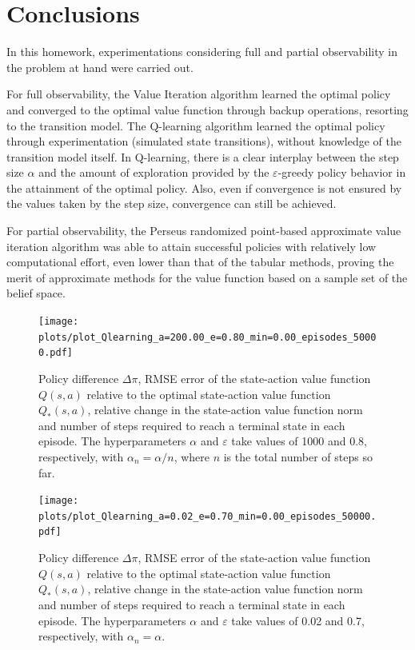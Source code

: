 \documentclass[a4paper]{article}
\begin{document}
\section{Conclusions}

In this homework, experimentations considering full and partial observability in the problem at hand were carried out.

For full observability, the Value Iteration algorithm learned the optimal policy and converged to the optimal value function through backup operations, resorting to the transition model. The Q-learning algorithm learned the optimal policy through experimentation (simulated state transitions), without knowledge of the transition model itself. In Q-learning, there is a clear interplay between the step size $\alpha$ and the amount of exploration provided by the $\varepsilon$-greedy policy behavior in the attainment of the optimal policy. Also, even if convergence is not ensured by the values taken by the step size, convergence can still be achieved. 

For partial observability, the Perseus randomized point-based approximate value iteration algorithm was able to attain successful policies with relatively low computational effort, even lower than that of the tabular methods, proving the merit of approximate methods for the value function based on a sample set of the belief space.


\begin{figure}[htbp]
\centering
\texttt{[image: plots/plot\_Qlearning\_a=200.00\_e=0.80\_min=0.00\_episodes\_50000.pdf]}
\caption{Policy difference $\Delta \pi$, RMSE error of the state-action value function $Q(s,a)$ relative to the optimal state-action value function $Q_{*}(s,a)$, relative change in the state-action value function norm and number of steps required to reach a terminal state in each episode. The hyperparameters $\alpha$ and $\varepsilon$ take values of 1000 and 0.8, respectively, with $\alpha_n = \alpha / n$, where $n$ is the total number of steps so far.}
\label{fig:q_learning_convergence_ensured}
\end{figure}

\begin{figure}[htbp]
\centering
\texttt{[image: plots/plot\_Qlearning\_a=0.02\_e=0.70\_min=0.00\_episodes\_50000.pdf]}
\caption{Policy difference $\Delta \pi$, RMSE error of the state-action value function $Q(s,a)$ relative to the optimal state-action value function $Q_{*}(s,a)$, relative change in the state-action value function norm and number of steps required to reach a terminal state in each episode. The hyperparameters $\alpha$ and $\varepsilon$ take values of 0.02 and 0.7, respectively, with $\alpha_n = \alpha$.}
\label{fig:q_learning_convergence_not_ensured}
\end{figure}
\end{document}
